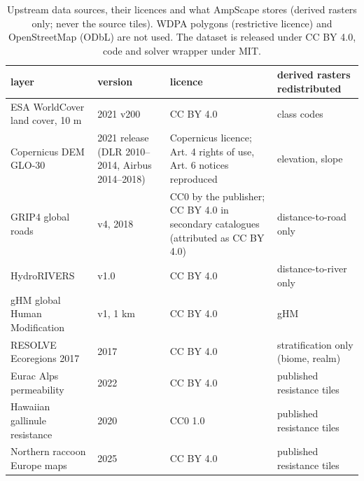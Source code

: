 \begin{table}[htbp]
\centering
\scriptsize
\setlength{\tabcolsep}{3.5pt}
\caption{Upstream data sources, their licences and what AmpScape stores (derived rasters only; never the source tiles). WDPA polygons (restrictive licence) and OpenStreetMap (ODbL) are not used. The dataset is released under CC BY 4.0, code and solver wrapper under MIT.}
\label{tab:licences}
\setlength{\tabcolsep}{2.2pt}
\begin{tabular}{p{2.9cm}p{2.9cm}p{4.6cm}p{2.7cm}}
\toprule
layer & version & licence & derived rasters redistributed \\
\midrule
ESA WorldCover land cover, 10 m & 2021 v200 & CC BY 4.0 & class codes \\
Copernicus DEM GLO-30 & 2021 release (DLR 2010--2014, Airbus 2014--2018) & Copernicus licence; Art. 4 rights of use, Art. 6 notices reproduced & elevation, slope \\
GRIP4 global roads & v4, 2018 & CC0 by the publisher; CC BY 4.0 in secondary catalogues (attributed as CC BY 4.0) & distance-to-road only \\
HydroRIVERS & v1.0 & CC BY 4.0 & distance-to-river only \\
gHM global Human Modification & v1, 1 km & CC BY 4.0 & gHM \\
RESOLVE Ecoregions 2017 & 2017 & CC BY 4.0 & stratification only (biome, realm) \\
Eurac Alps permeability & 2022 & CC BY 4.0 & published resistance tiles \\
Hawaiian gallinule resistance & 2020 & CC0 1.0 & published resistance tiles \\
Northern raccoon Europe maps & 2025 & CC BY 4.0 & published resistance tiles \\
\bottomrule
\end{tabular}
\end{table}
